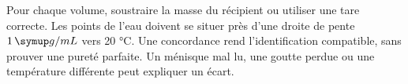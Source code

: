 \par\noindent\begin{minipage}{\linewidth}
\label{cor-activite-1}
Pour chaque volume, soustraire la masse du récipient ou utiliser une tare correcte. Les points de l’eau doivent se situer près d’une droite de pente $1\unite{g/mL}$ vers 20 °C. Une concordance rend l’identification compatible, sans prouver une pureté parfaite. Un ménisque mal lu, une goutte perdue ou une température différente peut expliquer un écart.\par\end{minipage}
